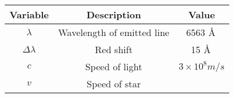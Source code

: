 \begin{tabular}[12.1pt]{ |c| c| c|}
    \hline
    \textbf{Variable} & \textbf{Description} &\textbf{Value}\\ 
    \hline
    $\lambda$ & Wavelength of emitted line & 6563 \AA\, \\
    \hline 
    $\Delta\lambda$ & Red shift & 15 \AA\, \\
    \hline 
    $c$ & Speed of light &$3\times10^8 m/s$ \\
    \hline 
    $v$ & Speed of star &\\
    \hline  
\end{tabular}
